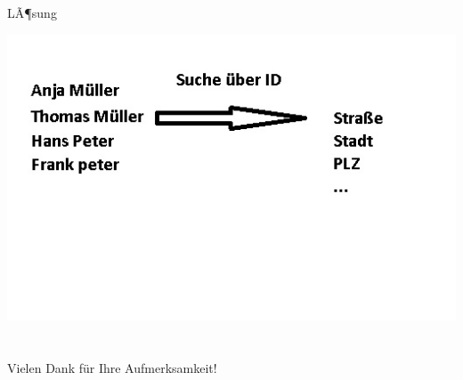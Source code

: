 \documentclass[xcolor={usenames,dvipsnames}, compress, 10pt]{beamer}
\begin{document}
\begin{frame}{LÃ¶sung}
\begin{center}


\includegraphics[width=\textheight]{Bilder/presi2.jpg} 

\end{center}
\end{frame}




\section*{}
\begin{frame}{Vielen Dank f\"ur Ihre Aufmerksamkeit!}
\tableofcontents
\end{frame}
\end{document}
